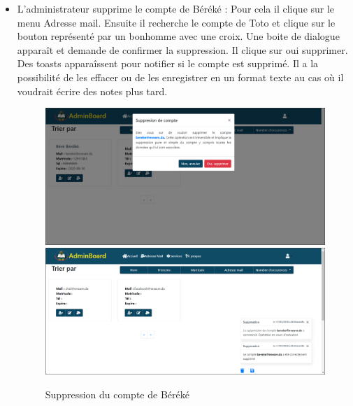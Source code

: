 \documentclass[a4paper,12pt,french]{report} %
\begin{document}
\begin{itemize}
\item L'administrateur supprime le compte de Béréké : Pour cela il clique sur le menu Adresse mail. Ensuite il recherche le compte de Toto et clique sur le bouton représenté par un bonhomme avec une croix. Une boite de dialogue apparaît et demande de confirmer la suppression. Il clique sur oui supprimer. Des toasts apparaîssent pour notifier si le compte est supprimé. Il a la possibilité de les effacer ou de les enregistrer en un format texte au cas où il voudrait écrire des notes plus tard. 
\begin{figure}[H]
\centering
\includegraphics[width=483pt]{figure/admin_delete_bereke_acount1.png} \\[1cm]
\includegraphics[width=483pt]{figure/admin_delete_bereke_acount2.png}
\caption{Suppression du compte de Béréké}
\end{figure}  

\end{itemize}
\end{document}
